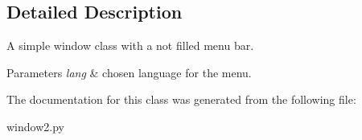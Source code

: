 \subsection{\-Detailed \-Description}
\-A simple window class with a not filled menu bar. 


\begin{DoxyParams}{\-Parameters}
{\em lang} & chosen language for the menu. \\
\hline
\end{DoxyParams}


\-The documentation for this class was generated from the following file\-:\begin{DoxyCompactItemize}
\item 
window2.\-py\end{DoxyCompactItemize}
